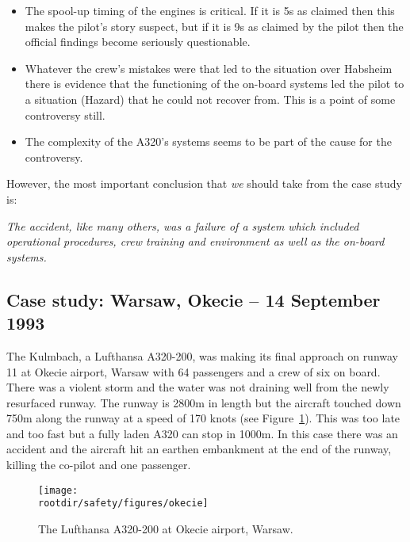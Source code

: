   \begin{itemize}

  \item The spool-up timing of the engines is critical.  If it is 5s as
  claimed then this makes the pilot's story suspect, but if it is 9s as
  claimed by the pilot then the official findings become seriously
  questionable.

  \item Whatever the crew's mistakes were that led to the situation over
  Habsheim there is evidence that the functioning of the on-board
  systems led the pilot to a situation (Hazard) that he could not
  recover from.  This is a point of some controversy still.

  \item The complexity of the A320's systems seems to be part of the
  cause for the controversy.  

  \end{itemize}

  However, the most important conclusion that \emph{we} should take from the case study is:

  \emph{The accident, like many others, was a failure of a system which
  included operational procedures, crew training and environment as well
  as the on-board systems.}




  \subsection{Case study: Warsaw, Okecie -- 14 September 1993}

   The Kulmbach, a Lufthansa A320-200, was making its final
    approach on runway 11 at Okecie airport, Warsaw with 64
    passengers and a crew of six on board.  There was a violent storm
    and the water was not draining well from the newly resurfaced
    runway.  The runway is 2800m in length but the aircraft touched
    down 750m along the runway at a speed of 170 knots (see Figure~\ref{fig:safety:okecie}).  This was too
    late and too fast but a fully laden A320 can stop in 1000m.  In
    this case there was an accident and the aircraft hit an earthen
    embankment at the end of the runway, killing the co-pilot and
    one passenger.  

  \begin{figure}[!h]
    \centering
    \texttt{[image: \\rootdir/safety/figures/okecie]}
   \caption{The Lufthansa A320-200 at Okecie airport, Warsaw.}
   \label{fig:safety:okecie}
  \end{figure}




